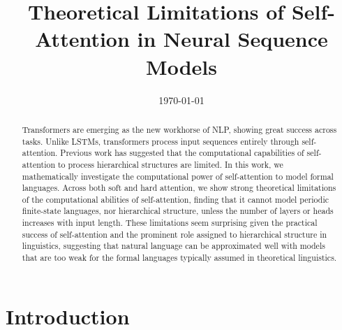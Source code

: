 \documentclass[11pt,a4paper]{article}
\title{Theoretical Limitations of Self-Attention in Neural Sequence Models}
\date{\today}
\begin{document}
\maketitle
\begin{abstract}
Transformers are emerging as the new workhorse of NLP, showing great success across tasks.
Unlike LSTMs, transformers process input sequences entirely through self-attention.
Previous work has suggested that the computational capabilities of self-attention to process hierarchical structures are limited.
In this work, we mathematically investigate the computational power of self-attention to model formal languages.
Across both soft and hard attention, we show strong theoretical limitations of the computational abilities of self-attention, finding that it cannot model periodic finite-state languages, nor hierarchical structure, unless the number of layers or heads increases with input length.
These limitations seem surprising given the practical success of self-attention and the prominent role assigned to hierarchical structure in linguistics, suggesting that natural language can be approximated well with models that are too weak for the formal languages typically assumed in theoretical linguistics. %
\end{abstract}

\section{Introduction}
\end{document}
